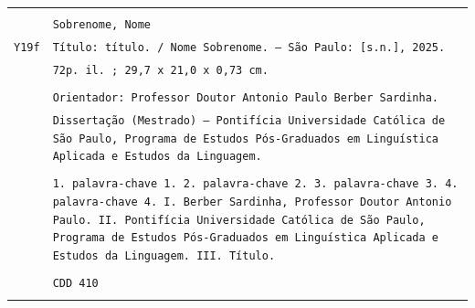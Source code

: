 \begin{titlepage}
\begin{center}
        \begin{tabular}{|p{1cm} p{11.5cm}|}
            \hline
             & \\
             & \texttt{\small Sobrenome, Nome} \\
            \texttt{\small Y19f} & \texttt{\small Título: título. / \texttt{\small Nome Sobrenome. --- São Paulo: [s.n.], 2025.}} \\
             & \texttt{\small 72p. il. ; 29,7 x 21,0 x 0,73 cm.} \\
             & \\
             & \texttt{\small Orientador: Professor Doutor Antonio Paulo Berber Sardinha.} \\
             & \texttt{\small Dissertação (Mestrado) --- Pontifícia Universidade Católica de São Paulo, Programa de Estudos Pós-Graduados em Linguística Aplicada e Estudos da Linguagem.} \\
             & \\
             & \texttt{\small \small 1. palavra-chave 1. 2. palavra-chave 2. 3. palavra-chave 3. 4. palavra-chave 4. I. Berber Sardinha, Professor Doutor Antonio Paulo. II. Pontifícia Universidade Católica de São Paulo, Programa de Estudos Pós-Graduados em Linguística Aplicada e Estudos da Linguagem. III. Título.} \\
             & \\
             & \hspace{8cm} \texttt{\small CDD 410} \\
             & \\
             \hline
        \end{tabular}
    \end{center}
\end{titlepage}

